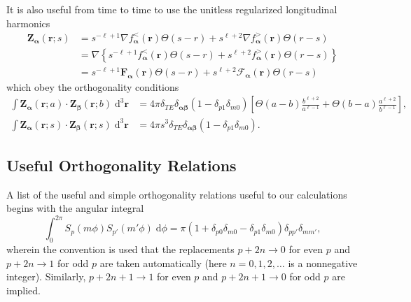 It is also useful from time to time to use the unitless regularized longitudinal harmonics
\begin{equation}
\begin{split}
\mathbf{Z}_{\bm{\alpha}}(\mathbf{r};s) &= s^{-\ell + 1}\nabla f_{\bm{\alpha}}^<(\mathbf{r})\Theta(s - r) + s^{\ell + 2}\nabla f_{\bm{\alpha}}^>(\mathbf{r})\Theta(r - s)\\
&= \nabla\left\{s^{-\ell + 1} f_{\bm{\alpha}}^<(\mathbf{r})\Theta(s - r) + s^{\ell + 2} f_{\bm{\alpha}}^>(\mathbf{r})\Theta(r - s)\right\}\\
&= s^{-\ell + 1}\mathbf{F}_{\bm{\alpha}}(\mathbf{r})\Theta(s - r) + s^{\ell + 2}\bm{\mathcal{F}}_{\bm{\alpha}}(\mathbf{r})\Theta(r - s)
\end{split}
\end{equation}
which obey the orthogonality conditions
\begin{equation}
\begin{split}
\int\mathbf{Z}_{\bm{\alpha}}(\mathbf{r};a)\cdot\mathbf{Z}_{\bm{\beta}}(\mathbf{r};b)\;\mathrm{d}^3\mathbf{r} &= 4\pi\delta_{TE}\delta_{\bm{\alpha}\bm{\beta}}(1 - \delta_{p1}\delta_{m0})\left[\Theta(a - b)\frac{b^{\ell + 2}}{a^{\ell - 1}} + \Theta(b - a)\frac{a^{\ell + 2}}{b^{\ell - 1}}\right],\\
\int\mathbf{Z}_{\bm{\alpha}}(\mathbf{r};s)\cdot\mathbf{Z}_{\bm{\beta}}(\mathbf{r};s)\;\mathrm{d}^3\mathbf{r} &= 4\pi s^3\delta_{TE}\delta_{\bm{\alpha}\bm{\beta}}(1 - \delta_{p1}\delta_{m0}).
\end{split}
\end{equation}








\subsection{Useful Orthogonality Relations}\label{sec:simpleOrthogonality}

A list of the useful and simple orthogonality relations useful to our calculations begins with the angular integral
\begin{equation}
\int_0^{2\pi}S_p(m\phi)S_{p'}(m'\phi)\;\mathrm{d}\phi = \pi(1 + \delta_{p0}\delta_{m0} - \delta_{p1}\delta_{m0})\delta_{pp'}\delta_{mm'},
\end{equation}
wherein the convention is used that the replacements $p + 2n\to 0$ for even $p$ and $p + 2n\to1$ for odd $p$ are taken automatically (here $n = 0,1,2,\ldots$ is a nonnegative integer). Similarly, $p + 2n + 1\to 1$ for even $p$ and $p + 2n + 1\to0$ for odd $p$ are implied. 

